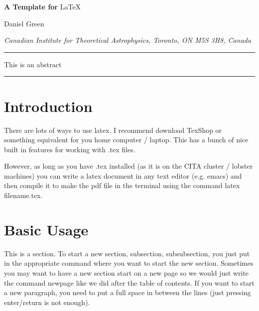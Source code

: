 \documentclass[11pt]{article}
\numberwithin{equation}{section}
\begin{document}
\begin{titlepage}


\begin{center}

{\fontsize{20}{28}\selectfont  \sffamily \bfseries A Template for} {\fontsize{20}{28}\selectfont   \LaTeX}

\end{center}

\vspace{0.2cm}

\begin{center}
{\fontsize{14}{18}\selectfont  Daniel Green}
\end{center}

\begin{center}
\textsl{ Canadian Institute for Theoretical Astrophysics, Toronto, ON M5S 3H8, Canada}
\end{center}


\vspace{1.2cm}
\hrule \vspace{0.3cm}
This is an abstract
\vskip 10pt
\hrule

\vspace{0.6cm}
\end{titlepage}


\tableofcontents

\newpage 


\section{Introduction}\label{sec:intro}

There are lots of ways to use latex.  I recommend download TexShop or something equivalent for you home computer / laptop.  This has a bunch of nice built in features for working with .tex files.

However, as long as you have .tex installed (as it is on the CITA cluster / lobster machines) you can write a latex document in any text editor (e.g. emacs) and then compile it to make the pdf file in the terminal using the command latex filename.tex.

\section{Basic Usage}\label{sec:basics}
This is a section.  To start a new section, subsection, subsubsection, you just put in the appropriate command where you want to start the new section.  Sometimes you may want to have a new section start on a new page so we would just write the command newpage like we did after the table of contents.
If you want to start a new paragraph, you need to put a full space in between the lines (just pressing enter/return is not enough).
\end{document}
